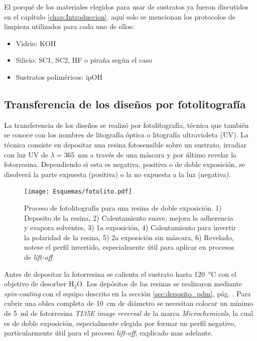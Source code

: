 			\pagebreak El porqué de los materiales elegidos para usar de sustratos ya fueron discutidos en el capítulo \ref{chap:Introduccion}, aquí solo se mencionan los protocolos de limpieza\cite{Franssila2004,Kern1990} utilizados para cada uno de ellos:

				\begin{itemize}
					\item{Vidrio: KOH}
					\item{Silicio: SC1, SC2, HF o piraña según el caso}
					\item{Sustratos poliméricos: ipOH}
				\end{itemize}

    \subsection{Transferencia de los diseños por fotolitografía}\label{sec:fotolito}

		La transferencia de los diseños se realizó por fotolitografía, técnica que también se conoce con los nombres de litografía óptica o litografía ultravioleta (UV). La técnica consiste en depositar una resina fotosensible sobre un sustrato, irradiar con luz UV de $\lambda\!=$\SI{365}{nm} a través de una máscara y por último revelar la fotorresina. Dependiendo si esta es negativa, positiva o de doble exposición, se disolverá la parte expuesta (positiva) o la no expuesta a la luz (negativa). \cite{Jaeger2001,Franssila2004,Mack2007,Mack2006}
				

			  \begin{figure}[b!]
			  \begin{center}
			  \texttt{[image: Esquemas/fotolito.pdf]}
			  \caption[Esquema fotolitografía]{Proceso de fotolitografía para una resina de doble exposición. 1) Deposito de la resina, 2) Calentamiento suave, mejora la adherencia y evapora solventes, 3) 1$a$ exposición, 4) Calentamiento para invertir la polaridad de la resina, 5) 2$a$ exposición sin máscara, 6) Revelado, notese el perfil invertido, especialmente útil para aplicar en procesos de\textit{ lift-off}.}
			  \label{esq:fotolito}
			  \end{center}
			  \end{figure}	

		Antes de depositar la fotorresina se calienta el sustrato hasta \SI{120}{\celsius} con el objetivo de desorber H$_2$O. Los depósitos de las resinas se realizaron mediante \textit{spin-coating} con el equipo descrito en la sección \ref{sec:deposito_pdm}, pág. \pageref{sec:deposito_pdm}. Para cubrir una oblea completa de \SI{10}{\cm} de diámetro se necesitan colocar un mínimo de \SI{5}{\ml} de fotorresina \textit{TI35E image reversal} de la marca \textit{Microchemicals}, la cual es de doble exposición, especialmente elegida por formar un perfil negativo, particularmente útil para el proceso \textit{lift-off}, explicado mas adelante.\cite{MicrochemicalsTeam2009} 
	
